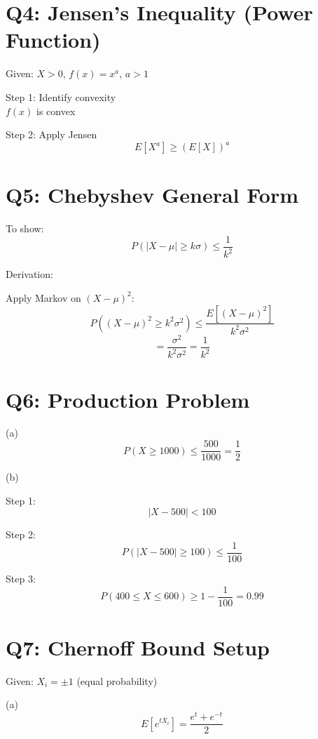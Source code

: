 \documentclass[11pt]{article}
\begin{document}
\section*{Q4: Jensen’s Inequality (Power Function)}

Given: $X > 0$, $f(x)=x^a$, $a>1$

Step 1: Identify convexity \\
$f(x)$ is convex

Step 2: Apply Jensen
\[
E[X^a] \ge (E[X])^a
\]

\vspace{0.5cm}

\section*{Q5: Chebyshev General Form}

To show:
\[
P(|X-\mu| \ge k\sigma) \le \frac{1}{k^2}
\]

Derivation:

Apply Markov on $(X-\mu)^2$:
\[
P((X-\mu)^2 \ge k^2\sigma^2) \le \frac{E[(X-\mu)^2]}{k^2\sigma^2}
\]
\[
= \frac{\sigma^2}{k^2\sigma^2} = \frac{1}{k^2}
\]

\vspace{0.5cm}

\section*{Q6: Production Problem}

(a)
\[
P(X \ge 1000) \le \frac{500}{1000} = \frac{1}{2}
\]

(b)

Step 1:
\[
|X-500| < 100
\]

Step 2:
\[
P(|X-500| \ge 100) \le \frac{1}{100}
\]

Step 3:
\[
P(400 \le X \le 600) \ge 1 - \frac{1}{100} = 0.99
\]

\vspace{0.5cm}

\section*{Q7: Chernoff Bound Setup}

Given: $X_i = \pm1$ (equal probability)

(a)
\[
E[e^{tX_i}] = \frac{e^t + e^{-t}}{2}
\]
\end{document}
